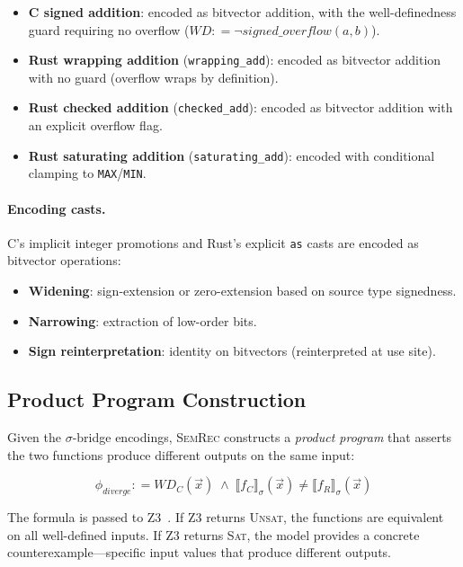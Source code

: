 \documentclass[10pt,letterpaper]{article}
\begin{document}
\begin{itemize}[itemsep=1pt]
\item \textbf{C signed addition}: encoded as bitvector addition, with the
  well-definedness guard requiring no overflow
  ($\mathit{WD} \mathrel{{:}{=}} \neg\mathit{signed\_overflow}(a, b)$).
\item \textbf{Rust wrapping addition} (\texttt{wrapping\_add}): encoded as
  bitvector addition with no guard (overflow wraps by definition).
\item \textbf{Rust checked addition} (\texttt{checked\_add}): encoded as
  bitvector addition with an explicit overflow flag.
\item \textbf{Rust saturating addition} (\texttt{saturating\_add}): encoded
  with conditional clamping to \texttt{MAX}/\texttt{MIN}.
\end{itemize}

\paragraph{Encoding casts.}
C's implicit integer promotions and Rust's explicit \texttt{as} casts are encoded
as bitvector operations:
\begin{itemize}[itemsep=1pt]
\item \textbf{Widening}: sign-extension or zero-extension based on source type signedness.
\item \textbf{Narrowing}: extraction of low-order bits.
\item \textbf{Sign reinterpretation}: identity on bitvectors (reinterpreted at use site).
\end{itemize}

\subsection{Product Program Construction}

Given the $\sigma$-bridge encodings, \textsc{SemRec} constructs a \emph{product program}
that asserts the two functions produce different outputs on the same input:

\begin{equation}
\label{eq:product}
\phi_{\mathit{diverge}} \mathrel{{:}{=}}
  \mathit{WD}_C(\vec{x}) \;\wedge\;
  \llbracket f_C \rrbracket_\sigma(\vec{x}) \neq
  \llbracket f_R \rrbracket_\sigma(\vec{x})
\end{equation}

The formula is passed to Z3~\cite{z3}. If Z3 returns \textsc{Unsat},
the functions are equivalent on all well-defined inputs. If Z3 returns \textsc{Sat},
the model provides a concrete counterexample---specific input values that produce
different outputs.
\end{document}
